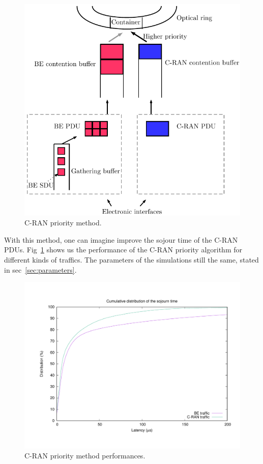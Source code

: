 \documentclass[]{algotel}
\begin{document}
    \begin{figure}[h]
\begin{center}   
      \includegraphics[scale=0.7]{cranprio.pdf}
     \caption{C-RAN priority method.}
\end{center}
  \end{figure}
  
  With this method, one can imagine improve the sojour time of the C-RAN PDUs. Fig~\ref{fig:prior} shows us the performance of the C-RAN priority algorithm for different kinds of traffics. The parameters of the simulations still the same, stated in sec~\ref{sec:parameters}.
      \begin{figure}[h]
      \label{fig:prior}
\begin{center}   

      \includegraphics[scale=0.4]{prior.pdf}

     \caption{C-RAN priority method performances.}
\end{center}
  \end{figure}
  
\end{document}
